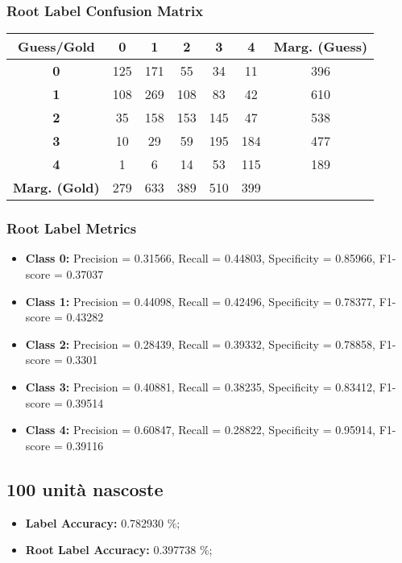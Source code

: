 \subsubsection{Root Label Confusion Matrix}
\begin{table}[h]
\centering
\begin{tabular}{c|ccccc|c}
\textbf{Guess/Gold} & \textbf{0} & \textbf{1} & \textbf{2} & \textbf{3} & \textbf{4} & \textbf{Marg. (Guess)} \\
\hline
\textbf{0} & 125 & 171 & 55 & 34 & 11 & 396 \\
\textbf{1} & 108 & 269 & 108 & 83 & 42 & 610 \\
\textbf{2} & 35 & 158 & 153 & 145 & 47 & 538 \\
\textbf{3} & 10 & 29 & 59 & 195 & 184 & 477 \\
\textbf{4} & 1 & 6 & 14 & 53 & 115 & 189 \\
\hline
\textbf{Marg. (Gold)} & 279 & 633 & 389 & 510 & 399 & \\
\end{tabular}
\end{table}

\subsubsection{Root Label Metrics}
\begin{itemize}
    \item \textbf{Class 0:} Precision = 0.31566, Recall = 0.44803, Specificity = 0.85966, F1-score = 0.37037
    \item \textbf{Class 1:} Precision = 0.44098, Recall = 0.42496, Specificity = 0.78377, F1-score = 0.43282
    \item \textbf{Class 2:} Precision = 0.28439, Recall = 0.39332, Specificity = 0.78858, F1-score = 0.3301
    \item \textbf{Class 3:} Precision = 0.40881, Recall = 0.38235, Specificity = 0.83412, F1-score = 0.39514
    \item \textbf{Class 4:} Precision = 0.60847, Recall = 0.28822, Specificity = 0.95914, F1-score = 0.39116
\end{itemize}

\subsection{100 unità nascoste}

\begin{itemize}
    \item \textbf{Label Accuracy:} 0.782930 \%;
    \item \textbf{Root Label Accuracy:} 0.397738 \%;
\end{itemize}

